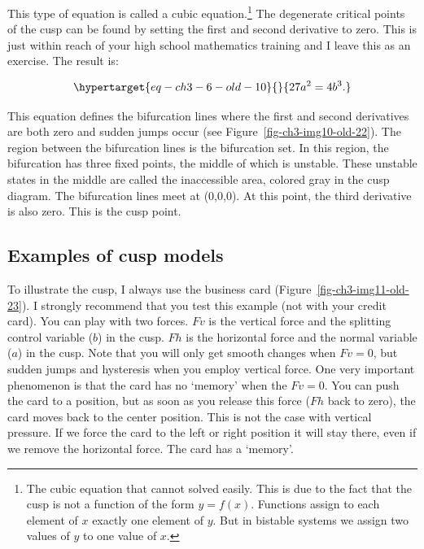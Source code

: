 \documentclass[
  a4paper,
  DIV=11,
  numbers=noendperiod,
  oneside]{scrreprt}
\begin{document}
This type of equation is called a cubic equation.\footnote{The cubic
  equation that cannot solved easily. This is due to the fact that the
  cusp is not a function of the form \(y = f(x)\). Functions assign to
  each element of \(x\) exactly one element of \(y\). But in bistable
  systems we assign two values of \(y\) to one value of \(x\).} The
degenerate critical points of the cusp can be found by setting the first
and second derivative to zero. This is just within reach of your high
school mathematics training and I leave this as an exercise. The result
is:

\begin{equation}\protect\hypertarget{eq-ch3-6-old-10}{}{
27a^{2} = 4b^{3}.
}\label{eq-ch3-6-old-10}\end{equation}

This equation defines the bifurcation lines where the first and second
derivatives are both zero and sudden jumps occur (see
Figure~\ref{fig-ch3-img10-old-22}). The region between the bifurcation
lines is the bifurcation set. In this region, the bifurcation has three
fixed points, the middle of which is unstable. These unstable states in
the middle are called the inaccessible area, colored gray in the cusp
diagram. The bifurcation lines meet at (0,0,0). At this point, the third
derivative is also zero. This is the cusp point.

\hypertarget{sec-Examples-of-cusp-models}{%
\subsection{Examples of cusp models}\label{sec-Examples-of-cusp-models}}

To illustrate the cusp, I always use the business card
(Figure~\ref{fig-ch3-img11-old-23}). I strongly recommend that you test
this example (not with your credit card). You can play with two forces.
\(Fv\) is the vertical force and the splitting control variable (\(b\))
in the cusp. \(Fh\) is the horizontal force and the normal variable
(\(a\)) in the cusp. Note that you will only get smooth changes when
\(Fv = 0\), but sudden jumps and hysteresis when you employ vertical
force. One very important phenomenon is that the card has no `memory'
when the \(Fv = 0\). You can push the card to a position, but as soon as
you release this force (\(Fh\) back to zero), the card moves back to the
center position. This is not the case with vertical pressure. If we
force the card to the left or right position it will stay there, even if
we remove the horizontal force. The card has a `memory'.
\end{document}
